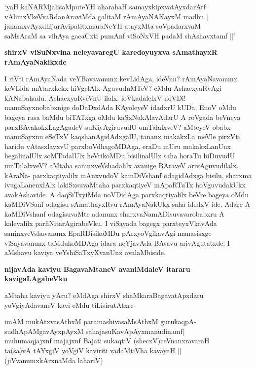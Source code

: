 \begin{shloka}
`yaH kaNARMjalisaMputeYH aharahaH samayxkipxvatAyxdarAtf\\
vAlimxVkeVvaRdanAraviMda galitaM rAmAyaNAKayxM madhu |\\
janamxvAyxdhijarAvipatitxmaraNeYH atayxMta soVpadarxvaM \\
saMsAraM sa vihAya gacaCxti pumAnf viSoNxVH padaM shAshavxtamf ||'
\end{shloka}

{\bf shirxV viSuNxvina neleyavaregU karedoyuyxva sAmathayxR rAmAyaNakikxde}

I riVti rAmAyaNada veYBavavanunx kevLidAga, ideVnu? rAmAyaNavanunx keVLida mAtarxkekx hiVgelAlx AguvuduMTeV? eMdu AshacxyaRvAgi kANabahudu. AshacxyaRveVnU ilalx. loVkadalelxV noVDi! manuSayxnobabxnige doDaDxdAda KAyoleyeV idadxrU kUDa, EnoV oMdu bageya rasa baMdu biTATxga oMdu kaSxNakAlavAdarU A roVgada beVneya parxBAvakokxLagAgadeV suKiyAgiruvudU omTalalxveV? aMteyeV obabx manuSayxnu eSeTxV kaqshanAgidAdxgalU, tananx makakxLa meVle pirxVti haridu vAtasxlayxvU parxboVdhagoMDAga, eraDu mUru makakxLanUnx hegalinalUlx soMTadalUlx heVrikoMDu bisilinalUlx saha horaTu biDuvudU umTalalxveV? aMtaha saninxveVshadalilx avanige BAraveV arivAguvudilalx. kAraNa- parxkaqtiyalilx inAnxvudoV kamDiVshanf odagidAdxga bisilu, sharxma ivugaLanenxlAlx lakiSxsuvaMtaha parxkaqtiyeV mApaRTuTx hoVguvudakUkx avakAshavide. A daqSiTxyiMda noVDidAga parxkaqtiyalilx beVre bageya oMdu kaMDiVSanf odagisu sAmathayxRvu rAmAyaNakUkx saha idedxV ide. Adare A kaMDiVshanf odagisuvaMte adanunx sharxvaNamADisuvavarobabxru A kaleyalilx parfiNitarAgirabeVku. I viSayada bagegx parxteyxVkavAda saninxveVshavanunx EpaRDisikoMDu pArxyoVgikavAgi manasisxge viSayavanunx taMdukoMDAga idara neYjavAda BAvavu arivAgutatxde. I aMshavu kaviya veYshiSaTxyXvanUnx avalaMbiside.

{\bf nijavAda kaviyu BagavaMtaneV avaniMdaleV itararu kavigaLAgabeVku}

aMtaha kaviyu yAru? eMdAga shirxV shaMkaraBagavatApxdaru yoVgiyAdavaneV kavi eMdu tiLisirutAtxre-

\begin{shloka}
imAM mukAtxvasAthxM paramashivasaMsAthxM gurukaqpA-\\
sudhApAMgavAyxpAyxM sahajasuKavApAyxmanudinamf|\\
muhumaqjajxnf majajxnf Bajati sukaqtiV (shecxV)ceVnanxravaraH\\
ta(sa)vA tAYxgiV yoVgiV kaviriti vadaMtiVha kavayaH || (jiVvanumxkArxnaMda lahariV)
\end{shloka}

